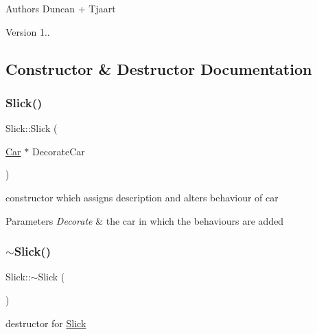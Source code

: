 \begin{DoxyAuthor}{Authors}
Duncan + Tjaart 
\end{DoxyAuthor}
\begin{DoxyVersion}{Version}
1.. 
\end{DoxyVersion}


\subsection{Constructor \& Destructor Documentation}
\mbox{\label{class_slick_ac66212273efddd6697d2042d6c2f9f9a}} 
\subsubsection{\texorpdfstring{Slick()}{Slick()}\hspace{0.1cm}{\footnotesize\ttfamily [1/2]}}
{\footnotesize\ttfamily Slick\+::\+Slick (\begin{DoxyParamCaption}\item[{\mbox{\hyperlink{class_car}{Car}} $\ast$}]{Decorate\+Car }\end{DoxyParamCaption})\hspace{0.3cm}{\ttfamily [inline]}}

constructor which assigns description and alters behaviour of car 
\begin{DoxyParams}{Parameters}
{\em Decorate} & the car in which the behaviours are added \\
\hline
\end{DoxyParams}
\mbox{\label{class_slick_a3b059145c3c0aa3dafd0f39f80298f3b}} 
\subsubsection{\texorpdfstring{$\sim$\+Slick()}{~Slick()}}
{\footnotesize\ttfamily Slick\+::$\sim$\+Slick (\begin{DoxyParamCaption}{ }\end{DoxyParamCaption})\hspace{0.3cm}{\ttfamily [inline]}}

destructor for \mbox{\hyperlink{class_slick}{Slick}} \mbox{\label{class_slick_ae34f904b44d660b2cba1b9ae71139d2e}} 
